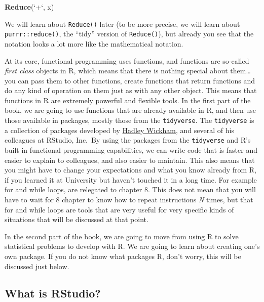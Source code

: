 \documentclass[]{gitbook}
\newenvironment{Shaded}{\begin{snugshade}}{\end{snugshade}}
\newcommand{\DataTypeTok}[1]{\textcolor[rgb]{0.13,0.29,0.53}{#1}}
\newcommand{\KeywordTok}[1]{\textcolor[rgb]{0.13,0.29,0.53}{\textbf{#1}}}
\newcommand{\NormalTok}[1]{#1}
\newcommand{\StringTok}[1]{\textcolor[rgb]{0.31,0.60,0.02}{#1}}
\theoremstyle{definition}
\theoremstyle{definition}
\theoremstyle{definition}
\theoremstyle{remark}
\begin{document}
\begin{Shaded}
\begin{Highlighting}[]
\KeywordTok{Reduce}\NormalTok{(}\StringTok{`}\DataTypeTok{+}\StringTok{`}\NormalTok{, x)}
\end{Highlighting}
\end{Shaded}

We will learn about \texttt{Reduce()} later (to be more precise, we will
learn about \texttt{purrr::reduce()}, the ``tidy'' version of
\texttt{Reduce()}), but already you see that the notation looks a lot
more like the mathematical notation.

At its core, functional programming uses functions, and functions are
so-called \emph{first class} objects in R, which means that there is
nothing special about them\ldots{} you can pass them to other functions,
create functions that return functions and do any kind of operation on
them just as with any other object. This means that functions in R are
extremely powerful and flexible tools. In the first part of the book, we
are going to use functions that are already available in R, and then use
those available in packages, mostly those from the \texttt{tidyverse}.
The \texttt{tidyverse} is a collection of packages developed by
\href{http://hadley.nz/}{Hadley Wickham}, and several of his colleagues
at RStudio, Inc.~By using the packages from the \texttt{tidyverse} and
R's built-in functional programming capabilities, we can write code that
is faster and easier to explain to colleagues, and also easier to
maintain. This also means that you might have to change your
expectations and what you know already from R, if you learned it at
University but haven't touched it in a long time. For example for and
while loops, are relegated to chapter 8. This does not mean that you
will have to wait for 8 chapter to know how to repeat instructions
\emph{N} times, but that for and while loops are tools that are very
useful for very specific kinds of situations that will be discussed at
that point.

In the second part of the book, we are going to move from using R to
solve statistical problems to develop with R. We are going to learn
about creating one's own package. If you do not know what packages R,
don't worry, this will be discussed just below.

\hypertarget{what-is-rstudio}{%
\subsection*{What is RStudio?}\label{what-is-rstudio}}
\end{document}
